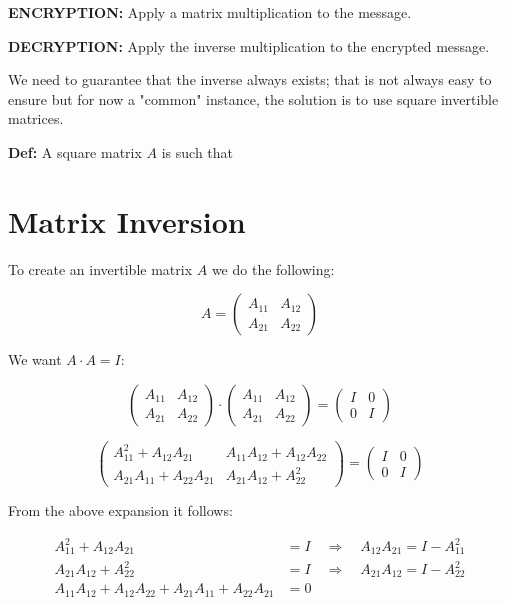\documentclass[a4paper, 12pt]{article}
\begin{document}
\textbf{ENCRYPTION:} Apply a matrix multiplication to the message.

\textbf{DECRYPTION:} Apply the inverse multiplication to the encrypted message.

We need to guarantee that the inverse always exists; that is not always easy to ensure but for now a "common" instance, the solution is to use square invertible matrices.

\textbf{Def:} A square matrix $A$ is such that

\section{Matrix Inversion}

To create an invertible matrix \( A \) we do the following:

\[
A = \begin{pmatrix}
A_{11} & A_{12} \\
A_{21} & A_{22}
\end{pmatrix}
\]

We want \( A \cdot A = I \):

\[
\begin{pmatrix}
A_{11} & A_{12} \\
A_{21} & A_{22}
\end{pmatrix}
\cdot
\begin{pmatrix}
A_{11} & A_{12} \\
A_{21} & A_{22}
\end{pmatrix}
=
\begin{pmatrix}
I & 0 \\
0 & I
\end{pmatrix}
\]

\[
\begin{pmatrix}
A_{11}^2 + A_{12} A_{21} & A_{11} A_{12} + A_{12} A_{22} \\
A_{21} A_{11} + A_{22} A_{21} & A_{21} A_{12} + A_{22}^2
\end{pmatrix}
=
\begin{pmatrix}
I & 0 \\
0 & I
\end{pmatrix}
\]

From the above expansion it follows:

\begin{align*}
A_{11}^2 + A_{12} A_{21} &= I \quad \Rightarrow \quad A_{12} A_{21} = I - A_{11}^2 \\
A_{21} A_{12} + A_{22}^2 &= I \quad \Rightarrow \quad A_{21} A_{12} = I - A_{22}^2 \\
A_{11} A_{12} + A_{12} A_{22} + A_{21} A_{11} + A_{22} A_{21} &= 0
\end{align*}
\end{document}
